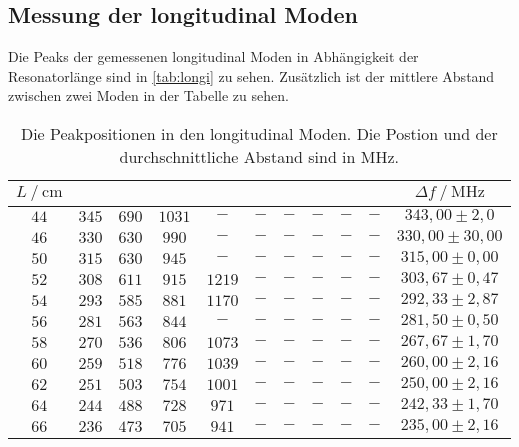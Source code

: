 \subsection{Messung der longitudinal Moden}
\label{sec:Stab_be}
Die Peaks der gemessenen longitudinal Moden in Abhängigkeit der Resonatorlänge sind in \autoref{tab:longi} zu sehen.
Zusätzlich ist der mittlere Abstand zwischen zwei Moden in der Tabelle zu sehen.

\begin{table}[H]
    \centering
    \caption{Die Peakpositionen in den longitudinal Moden. Die Postion und der durchschnittliche Abstand sind in $\unit{\mega\hertz}$.}
    \label{tab:longi}
    \begin{tabular}{c c c c c c c c c c | c}
    \toprule
      $L \mathbin{/} \unit{\centi\meter}$ & & & & & & & & & & $\Delta f \mathbin{/}  \unit{\mega\hertz}$   \\
    \midrule
        $44$ &  $345$ & $690$ &$ 1031$ & $-   $ & $-    $ & $-   $ & $-   $ & $-   $ &  $-   $ &  $ 343,00 \pm 2,0 $ \\
        $46$ &  $330$ & $630$ &$ 990$  & $-   $ & $-    $ & $-   $ & $-   $ & $-   $ &  $-   $ &  $ 330,00 \pm 30,00 $ \\
        $50$ &  $315$ & $630$ &$ 945$  & $-   $ & $-    $ & $-   $ & $-   $ & $-   $ &  $-   $ &  $ 315,00 \pm 0,00 $ \\
        $52$ &  $308$ & $611$ &$ 915$  & $1219$ & $-    $ & $-   $ & $-   $ & $-   $ &  $-   $ &  $ 303,67 \pm 0,47 $ \\
        $54$ &  $293$ & $585$ &$ 881$  & $1170$ & $-    $ & $-   $ & $-   $ & $-   $ &  $-   $ &  $ 292,33 \pm 2,87 $ \\
        $56$ &  $281$ & $563$ &$ 844$  & $-   $ & $-    $ & $-   $ & $-   $ & $-   $ &  $-   $ &  $ 281,50 \pm 0,50 $ \\
        $58$ &  $270$ & $536$ &$ 806$  & $1073$ & $-    $ & $-   $ & $-   $ & $-   $ &  $-   $ &  $ 267,67 \pm 1,70 $ \\
        $60$ &  $259$ & $518$ &$ 776$  & $1039$ & $-    $ & $-   $ & $-   $ & $-   $ &  $-   $ &  $ 260,00 \pm 2,16 $ \\
        $62$ &  $251$ & $503$ &$ 754$  & $1001$ & $-    $ & $-   $ & $-   $ & $-   $ &  $-   $ &  $ 250,00 \pm 2,16 $ \\
        $64$ &  $244$ & $488$ &$ 728$  & $971 $ & $-    $ & $-   $ & $-   $ & $-   $ &  $-   $ &  $ 242,33 \pm 1,70 $ \\
        $66$ &  $236$ & $473$ &$ 705$  & $941 $ & $-    $ & $-   $ & $-   $ & $-   $ &  $-   $ &  $ 235,00 \pm 2,16 $ \\

\end{tabular}
\end{table}
